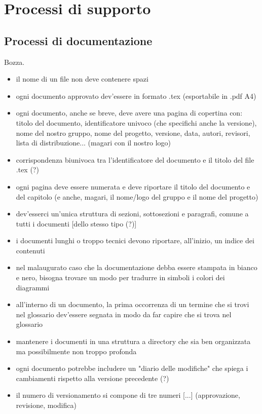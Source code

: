 \section{Processi di supporto}

\subsection{Processi di documentazione}
Bozza.
\begin{itemize}
	\item il nome di un file non deve contenere spazi 
	\item ogni documento approvato dev'essere in formato .tex (esportabile in .pdf A4)
	\item ogni documento, anche se breve, deve avere una pagina di copertina con: titolo del documento, identificatore univoco (che specifichi anche la versione), nome del nostro gruppo, nome del progetto, versione, data, autori, revisori, lista di distribuzione... (magari con il nostro logo)
	\item corrispondenza biunivoca tra l'identificatore del documento e il titolo del file .tex (?)
	\item ogni pagina deve essere numerata e deve riportare il titolo del documento e del capitolo (e anche, magari, il nome/logo del gruppo e il nome del progetto)
	\item dev'esserci un'unica struttura di sezioni, sottosezioni e paragrafi, comune a tutti i documenti [dello stesso tipo (?)]
	\item i documenti lunghi o troppo tecnici devono riportare, all'inizio, un indice dei contenuti
	\item nel malaugurato caso che la documentazione debba essere stampata in bianco e nero, bisogna trovare un modo per tradurre in simboli i colori dei diagrammi
	\item all'interno di un documento, la prima occorrenza di un termine che si trovi nel glossario dev'essere segnata in modo da far capire che si trova nel glossario
	\item mantenere i documenti in una struttura a directory che sia ben organizzata ma possibilmente non troppo profonda
	\item ogni documento potrebbe includere un "diario delle modifiche" che spiega i cambiamenti rispetto alla versione precedente (?)
	\item il numero di versionamento si compone di tre numeri [...] (approvazione, revisione, modifica)
\end{itemize}

